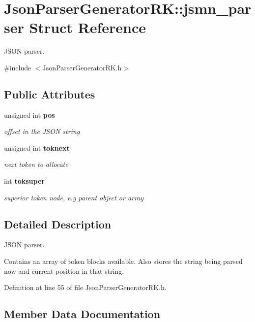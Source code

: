 \section{Json\+Parser\+Generator\+RK\+:\+:jsmn\+\_\+parser Struct Reference}
\label{struct_json_parser_generator_r_k_1_1jsmn__parser}


J\+S\+ON parser.  




{\ttfamily \#include $<$Json\+Parser\+Generator\+R\+K.\+h$>$}

\subsection*{Public Attributes}
\begin{DoxyCompactItemize}
\item 
unsigned int \textbf{ pos}
\begin{DoxyCompactList}\small\item\em offset in the J\+S\+ON string \end{DoxyCompactList}\item 
unsigned int \textbf{ toknext}
\begin{DoxyCompactList}\small\item\em next token to allocate \end{DoxyCompactList}\item 
int \textbf{ toksuper}
\begin{DoxyCompactList}\small\item\em superior token node, e.\+g parent object or array \end{DoxyCompactList}\end{DoxyCompactItemize}


\subsection{Detailed Description}
J\+S\+ON parser. 

Contains an array of token blocks available. Also stores the string being parsed now and current position in that string. 

Definition at line 55 of file Json\+Parser\+Generator\+R\+K.\+h.



\subsection{Member Data Documentation}
\mbox{\label{struct_json_parser_generator_r_k_1_1jsmn__parser_a7e1b077e5e56c0a1c6e8ec441963c0db}} 
